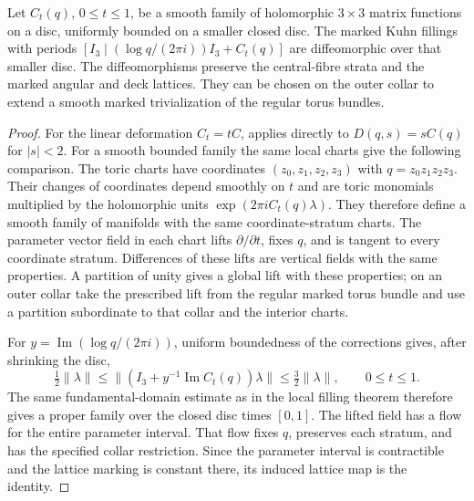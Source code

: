 \begin{lemma}
\hypertarget{tag-PV01}{}\label{pub:V:cusp-smooth-dependence}
Let $C_t(q)$, $0\leq t\leq1$, be a smooth family of holomorphic
$3\times3$ matrix functions on a disc, uniformly bounded on a
smaller closed disc.  The marked Kuhn fillings with periods
$[I_3\mid (\log q/(2\pi i))I_3+C_t(q)]$ are diffeomorphic over
that smaller disc.  The diffeomorphisms preserve the central-fibre
strata and the marked angular and deck lattices.  They can be chosen
on the outer collar to extend a smooth marked trivialization of the
regular torus bundles.
\end{lemma}
\begin{proof}
For the linear deformation $C_t=tC$, \cite[Theorem~8.7, arXiv v1, pp.~57--58]{Yang2026} applies directly to $D(q,s)=sC(q)$ for $|s|<2$.
For a smooth bounded family the same local charts give the following comparison. The toric charts have coordinates $(z_0,z_1,z_2,z_3)$ with
$q=z_0z_1z_2z_3$.  Their changes of coordinates depend smoothly
on $t$ and are toric monomials multiplied by the holomorphic units
$\exp(2\pi iC_t(q)\lambda)$.  They therefore define a smooth
family of manifolds with the same coordinate-stratum charts.
The parameter vector field in each chart lifts $\partial/\partial t$,
fixes $q$, and is tangent to every coordinate stratum.  Differences
of these lifts are vertical fields with the same properties.
A partition of unity gives a global lift with these properties;
on an outer collar take the prescribed lift from the regular marked
torus bundle and use a partition subordinate to that collar and the
interior charts.

For $y=\operatorname{Im}(\log q/(2\pi i))$, uniform boundedness
of the corrections gives, after shrinking the disc,
\[
 \tfrac12\|\lambda\|\leq
 \|(I_3+y^{-1}\operatorname{Im}C_t(q))\lambda\|
 \leq\tfrac32\|\lambda\|,
 \qquad 0\leq t\leq1.
\]
The same fundamental-domain estimate as in the local filling theorem
therefore gives a proper family over the closed disc times $[0,1]$.
The lifted field has a flow for the entire parameter interval.
That flow fixes $q$, preserves each stratum, and has the specified
collar restriction.  Since the parameter interval is contractible
and the lattice marking is constant there, its induced lattice map
is the identity.
\end{proof}

